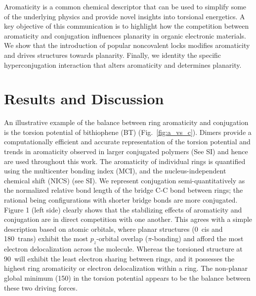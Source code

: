 Aromaticity is a common chemical descriptor that can be used to simplify some of the underlying physics and provide novel insights into torsional energetics. A key objective of this communication is to highlight how the competition between aromaticity and conjugation\cite{Hernandez1994, Kertesz2005, Huang2017} influences planarity in organic electronic materials. We show that the introduction of popular noncovalent locks modifies aromaticity and drives structures towards planarity. Finally, we identity the specific hyperconjugation interaction that alters aromaticity and determines planarity.

\section{Results and Discussion}

An illustrative example of the balance between ring aromaticity and conjugation is the torsion potential of bithiophene (BT) (Fig.~\ref{fig:a_vs_c}). Dimers provide a computationally efficient and accurate representation of the torsion potential and trends in aromaticity observed in larger conjugated polymers (See SI)\cite{Dubay2012} and hence are used throughout this work. The aromaticity of individual rings is quantified using the multicenter bonding index (MCI),\cite{Giambiagi1990, Giambiagi2000} and the nucleus-independent chemical shift (NICS)\cite{Fallah-Bagher-Shaidaei2006, Chen2005} (see SI). We represent conjugation semi-quantitatively as the normalized relative bond length of the bridge C-C bond between rings; the rational being configurations with shorter bridge bonds are more conjugated.\cite{Daudey1980, Fernandez2006} Figure 1 (left side) clearly shows that the stabilizing effects of aromaticity and conjugation are in direct competition with one another. This agrees with a simple description based on atomic orbitals, where planar structures (0\textdegree \ cis and 180\textdegree \ trans) exhibit the most $p_z$-orbital overlap ($\pi$-bonding) and afford the most electron delocalization across the molecule. Whereas the torsioned structure at 90\textdegree \ will exhibit the least electron sharing between rings, and it possesses the highest ring aromaticity or electron delocalization within a ring. The non-planar global minimum (150\textdegree) in the torsion potential appears to be the balance between these two driving forces.

